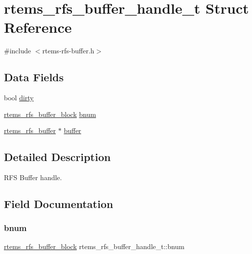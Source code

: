 \hypertarget{structrtems__rfs__buffer__handle__t}{}\section{rtems\+\_\+rfs\+\_\+buffer\+\_\+handle\+\_\+t Struct Reference}
\label{structrtems__rfs__buffer__handle__t}


{\ttfamily \#include $<$rtems-\/rfs-\/buffer.\+h$>$}

\subsection*{Data Fields}
\begin{DoxyCompactItemize}
\item 
bool \mbox{\hyperlink{structrtems__rfs__buffer__handle__t_a9cda14e8c9402d522a516d8e22a1c211}{dirty}}
\item 
\mbox{\hyperlink{rtems-rfs-buffer_8h_a5650d53328a5af0a78198fe780aec043}{rtems\+\_\+rfs\+\_\+buffer\+\_\+block}} \mbox{\hyperlink{structrtems__rfs__buffer__handle__t_af17a3763516914b0ec8eb535d86de75f}{bnum}}
\item 
\mbox{\hyperlink{struct__rtems__rfs__buffer}{rtems\+\_\+rfs\+\_\+buffer}} $\ast$ \mbox{\hyperlink{structrtems__rfs__buffer__handle__t_a6ff6e062d9d19ce744f5515a322ec195}{buffer}}
\end{DoxyCompactItemize}


\subsection{Detailed Description}
R\+FS Buffer handle. 

\subsection{Field Documentation}
\mbox{\label{structrtems__rfs__buffer__handle__t_af17a3763516914b0ec8eb535d86de75f}} 
\subsubsection{\texorpdfstring{bnum}{bnum}}
{\footnotesize\ttfamily \mbox{\hyperlink{rtems-rfs-buffer_8h_a5650d53328a5af0a78198fe780aec043}{rtems\+\_\+rfs\+\_\+buffer\+\_\+block}} rtems\+\_\+rfs\+\_\+buffer\+\_\+handle\+\_\+t\+::bnum}

